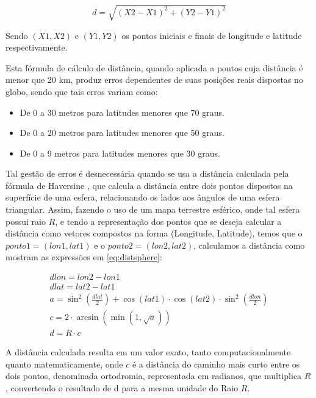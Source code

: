 \begin{equation}
\label{eq:pitagoras}
d = \sqrt{(X2 - X1)^2 + (Y2 - Y1)^2}
\end{equation}

Sendo \((X1, X2)\) e \((Y1,Y2)\) os pontos iniciais e finais de longitude e latitude respectivamente.

Esta fórmula de cálculo de distância, quando aplicada a pontos cuja distância é menor que 20 km, produz erros dependentes de suas posições reais dispostas no globo, sendo que tais erros variam como:
\begin{itemize}
\item De 0 a 30 metros para latitudes menores que 70 graus.
\item De 0 a 20 metros para latitudes menores que 50 graus. 
\item De 0 a 9 metros para latitudes menores que 30 graus.
\end{itemize}

Tal gestão de erros é desnecessária quando se usa a distância calculada pela fórmula de Haversine \cite{shumaker1984astronomical}, que calcula a distância entre dois pontos dispostos na superfície de uma esfera, relacionando os lados aos ângulos de uma esfera triangular. Assim, fazendo o uso de um mapa terrestre esférico, onde tal esfera possui raio \(R\), e tendo a representação dos pontos que se deseja calcular a distância como vetores compostos na forma (Longitude, Latitude), temos que o \(ponto1 = (lon1,lat1)\) e o \(ponto2 = (lon2,lat2)\), calculamos a distância como mostram as expressões em \ref{eq:distsphere}:

\begin{equation}
\label{eq:distsphere}
\begin{split}
dlon = lon2 - lon1 \\
dlat = lat2 - lat1 \\
a = \sin^2\left(\frac{dlat}{2}\right) + \cos(lat1) \cdot \cos(lat2) \cdot \sin^2\left(\frac{dlon}{2}\right) \\
c = 2 \cdot \arcsin(\min(1,\sqrt{a})) \\
d = R \cdot c 
\end{split}
\end{equation}

A distância calculada resulta em um valor exato, tanto computacionalmente quanto matematicamente, onde \(c\) é a distância do caminho mais curto entre os dois pontos, denominada ortodromia, representada em radianos, que multiplica \(R\), convertendo o resultado de d para a mesma unidade do Raio \(R\). 

